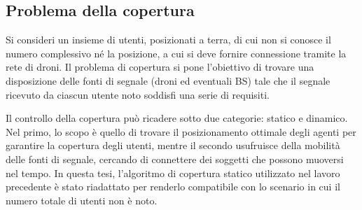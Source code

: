 \subsection{Problema della copertura} \label{subsec:prob_copertura}

Si consideri un insieme di utenti, posizionati a terra, di cui non si conosce il numero complessivo né la posizione, a cui si deve fornire connessione tramite la rete di droni.
Il problema di copertura si pone l'obiettivo di trovare una disposizione delle fonti di segnale (droni ed eventuali BS) tale che il segnale ricevuto da ciascun utente noto soddisfi una serie di requisiti.

Il controllo della copertura può ricadere sotto due categorie: statico e dinamico. 
Nel primo, lo scopo è quello di trovare il  posizionamento ottimale degli agenti per garantire la copertura degli utenti, mentre il secondo usufruisce della mobilità delle fonti di segnale, cercando di connettere dei soggetti che possono muoversi nel tempo.
In questa tesi, l'algoritmo di copertura statico \cite{tesiInnocenti} utilizzato nel lavoro precedente è stato riadattato per renderlo compatibile con lo scenario in cui il numero totale di utenti non è noto.